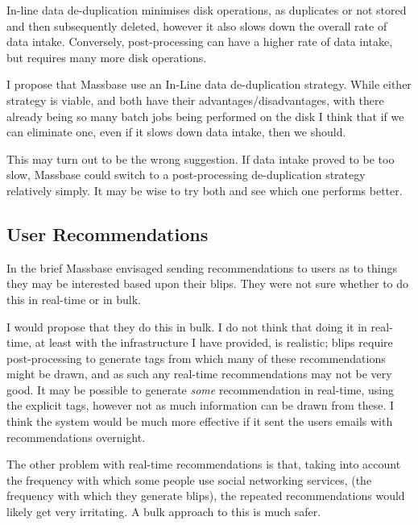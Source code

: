 \documentclass[12pt,a4paper]{article}
\begin{document}
In-line data de-duplication minimises disk operations, as duplicates or not stored and then subsequently deleted, however it also slows down the overall rate of data intake. Conversely, post-processing can have a higher rate of data intake, but requires many more disk operations.

I propose that Massbase use an In-Line data de-duplication strategy. While either strategy is viable, and both have their advantages/disadvantages, with there already being so many batch jobs being performed on the disk I think that if we can eliminate one, even if it slows down data intake, then we should.

This may turn out to be the wrong suggestion. If data intake proved to be too slow, Massbase could switch to a post-processing de-duplication strategy relatively simply. It may be wise to try both and see which one performs better.

\subsection{User Recommendations}
In the brief Massbase envisaged sending recommendations to users as to things they may be interested based upon their blips. They were not sure whether to do this in real-time or in bulk.

I would propose that they do this in bulk. I do not think that doing it in real-time, at least with the infrastructure I have provided, is realistic; blips require post-processing to generate tags from which many of these recommendations might be drawn, and as such any real-time recommendations may not be very good. It may be possible to generate \emph{some} recommendation in real-time, using the explicit tags, however not as much information can be drawn from these. I think the system would be much more effective if it sent the users emails with recommendations overnight.

The other problem with real-time recommendations is that, taking into account the frequency with which some people use social networking services, (the frequency with which they generate blips), the repeated recommendations would likely get very irritating. A bulk approach to this is much safer.
\end{document}
